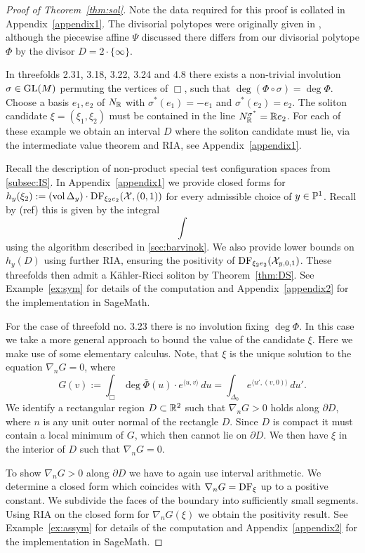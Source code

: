 \begin{proof}[Proof of Theorem~\ref{thm:sol}]
Note the data required for this proof is collated in Appendix~\ref{appendix1}. The divisorial polytopes were originally given in \cite{suss2013fano}, although the piecewise affine \(\Psi\) discussed there differs from our divisorial polytope \(\Phi\) by the divisor \(D = 2 \cdot \{ \infty \}\).

In threefolds 2.31, 3.18, 3.22, 3.24 and 4.8 there exists a non-trivial involution \(\sigma \in \operatorname{GL}(M)\) permuting the vertices of \(\Box\), such that \(\deg (\Phi \circ \sigma) = \deg \Phi\). Choose a basis $e_1, e_2$ of $N_{\mathbb{R}}$ with $\sigma^*(e_1)=-e_1$ and $\sigma^*(e_2)=e_2$. The soliton candidate $\xi = (\xi_1,\xi_2)$ must be contained in the line $N_{\mathbb{R}}^{\sigma^*} = \mathbb{R} e_2$. For each of these example we obtain an interval \(D\) where the soliton candidate must lie, via the intermediate value theorem and RIA, see Appendix~\ref{appendix1}.

Recall the description of non-product special test configuration spaces from \ref{subsec:IS}. In Appendix~\ref{appendix1} we provide closed forms for \(h_y(\xi_2) := (\mathop{\rm vol}\nolimits \Delta_y) \cdot \mathop{\rm DF}\nolimits_{\xi_2 e_2}({\mathcal{X}},(0,1))\) for every admissible choice of $y \in \mathbb{P}^1$. Recall by (ref) this is given by the integral
\begin{equation} \label{eq:specialDF}
\int
\end{equation}
using the algorithm described in \ref{sec:barvinok}. We also provide lower bounds on \(h_y(D)\) using further RIA, ensuring the positivity of $\mathop{\rm DF}\nolimits_{\xi_2 e_2}({\mathcal{X}}_{y,0,1})$. These threefolds then admit a K\"ahler-Ricci soliton by Theorem~\ref{thm:DS}. See Example~\ref{ex:sym} for details of the computation and Appendix~\ref{appendix2} for the implementation in SageMath.

For the case of threefold no. 3.23 there is no involution fixing $\deg \Phi$. In this case we take a more general approach to bound the value of the candidate \(\xi\). Here we make use of some elementary calculus. Note, that \(\xi\) is the unique solution to the equation \(\nabla_n G = 0 \), where 
\[
G(v) := \int_{\Box} \deg \bar \Phi(u) \cdot e^{\langle u, v \rangle}\, du = 
\int_{\Delta_0} e^{\langle u', (v,0) \rangle} \, du'.
\]
We identify a rectangular region \(D \subset \mathbb{R}^2 \) such that \(\nabla_n G > 0 \) holds along \(\partial D\), where \(n\) is any unit outer normal of the rectangle \(D\). Since $D$ is compact it must contain a local minimum of $G$, which then cannot lie on \(\partial D\). We then have \(\xi\) in the interior of \(D\) such that \(\nabla_n G = 0\).

To show $\nabla_n G >0 $ along $\partial D$ we have to again use interval arithmetic. We determine a closed form which coincides with $\nabla_n G = \mathop{\rm DF}\nolimits_\xi$ up to a positive constant. We subdivide the faces of the boundary into sufficiently small segments. Using RIA on the closed form for $\nabla_n G(\xi)$ we obtain the positivity result. See Example~\ref{ex:assym} for details of the computation and Appendix~\ref{appendix2} for the implementation in SageMath.
\end{proof}
